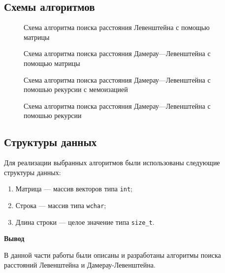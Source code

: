 \subsection{Схемы алгоритмов}
\begin{figure}[H]
	\centering
	
	
	\caption{Схема алгоритма поиска расстояния Левенштейна с помощью матрицы}
	\label{fig:leb_algo_matrix}
\end{figure}

\begin{figure}[H]
	\centering
	
	
	\caption{Схема алгоритма поиска расстояния Дамерау---Левенштейна с помощью матрицы}
	\label{fig:dam_algo_matrix}
\end{figure}

\begin{figure}[H]
	\centering
	
	\caption{Схема алгоритма поиска расстояния Дамерау---Левенштейна с помошью рекурсии с мемоизацией}
	\label{fig:dam_algo_rec_mem}
\end{figure}

\begin{figure}[H]
	\centering
	
	\caption{Схема алгоритма поиска расстояния Дамерау---Левенштейна с помошью рекурсии}
	\label{fig:dam_algo_rec}
\end{figure}


\subsection{Структуры данных}
Для реализации выбранных алгоритмов были использованы следующие структуры данных:
\begin{enumerate}
	\item Матрица --- массив векторов типа \texttt{int};
	\item Строка --- массив типа \texttt{wchar};
	\item Длина строки --- целое значение типа \texttt{size\_t}.
\end{enumerate}


\textbf{Вывод}

В данной части работы были описаны и разработаны алгоритмы  поиска расстояний Левенштейна и Дамерау-Левенштейна.









